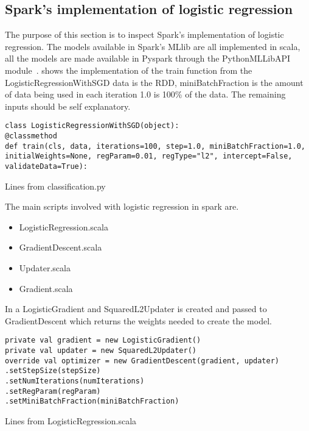 \subsection{Spark's implementation of logistic regression}\label{sec:sparklogreg}
The purpose of this section is to inspect Spark’s implementation of logistic regression.
The models available in Spark's MLlib are all implemented in scala, all the models are made available in Pyspark through the PythonMLLibAPI module~\cite{hadoopIntro}.
 shows the implementation of the train function from the LogisticRegressionWithSGD data is the RDD, miniBatchFraction is the amount of data being used in each iteration 1.0 is 100\% of the data. The remaining inputs should be self explanatory.   
\begin{listing}[H]
\begin{verbatim}
class LogisticRegressionWithSGD(object):
@classmethod
def train(cls, data, iterations=100, step=1.0, miniBatchFraction=1.0,
initialWeights=None, regParam=0.01, regType="l2", intercept=False,
validateData=True):
\end{verbatim}
\label{lst:py_logreg}
\caption{Lines from classification.py}
\end{listing}

The main scripts involved with logistic regression in spark are.
\begin{itemize}
\item LogisticRegression.scala
\item GradientDescent.scala
\item Updater.scala
\item Gradient.scala
\end{itemize}

In  a LogisticGradient and SquaredL2Updater is created and passed to GradientDescent which returns the weights needed to create the model.
\begin{listing}[H]
\begin{verbatim}
private val gradient = new LogisticGradient()
private val updater = new SquaredL2Updater()
override val optimizer = new GradientDescent(gradient, updater)
.setStepSize(stepSize)
.setNumIterations(numIterations)
.setRegParam(regParam)
.setMiniBatchFraction(miniBatchFraction)
\end{verbatim}
\caption{Lines from LogisticRegression.scala}
\label{lst:gd_logreg}
\end{listing}

